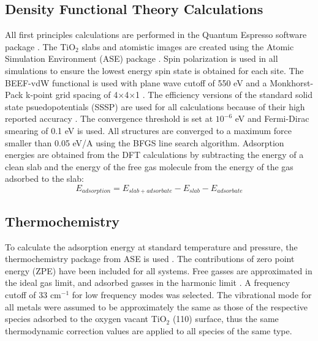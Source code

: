 \subsection{Density Functional Theory Calculations}
All first principles calculations are performed in the Quantum Espresso software package \cite{QE-2009}.
The TiO$_2$ slabs and atomistic images are created using the Atomic Simulation Environment (ASE) package \cite{ase-paper}.  Spin polarization is used in all simulations to ensure the lowest energy spin state is obtained for each site. The BEEF-vdW functional \cite{Wellendorff_2012} is used with plane wave cutoff of 550 eV and a Monkhorst-Pack k-point grid spacing of 4$\times$4$\times$1 \cite{Monkhorst_1976}. The efficiency versions of the standard solid state psuedopotentials \cite{SSSP_pseudos} (SSSP) are used for all calculations because of their high reported accuracy \cite{Lejaeghereaad3000}. The convergence threshold is set at $10^{-6}$ eV and Fermi-Dirac smearing of 0.1 eV is used. All structures are converged to a maximum force smaller than 0.05 eV/A using the BFGS line search algorithm. Adsorption energies are obtained from the DFT calculations by subtracting the energy of a clean slab and the energy of the free gas molecule from the energy of the gas adsorbed to the slab:
\begin{equation}
E_{adsorption} = E_{slab+adsorbate} - E_{slab} - E_{adsorbate}
\end{equation}

\subsection{Thermochemistry}

To calculate the adsorption energy at standard temperature and pressure, the thermochemistry package from ASE is used \cite{ase-paper}. The contributions of zero point energy (ZPE) have been included for all systems. Free gasses are approximated in the ideal gas limit, and adsorbed gasses in the harmonic limit \cite{Reuter_2005}. A frequency cutoff of 33 cm$^{-1}$ for low frequency modes was selected. The vibrational mode for all metals were assumed to be approximately the same as those of the respective species adsorbed to the oxygen vacant TiO$_2$ (110) surface, thus the same thermodynamic correction values are applied to all species of the same type.

